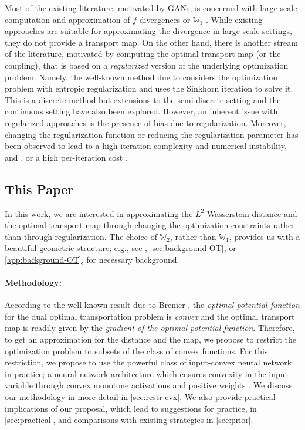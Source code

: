 \documentclass[10pt]{article}
\newcommand{\W}{\mathds{W}}
\numberwithin{equation}{section}
\begin{document}
Most of the existing literature, motivated by GANs, is concerned with large-scale computation and approximation of $f$-divergences \citep{nowozin2016f} or $\W_1$ \citep{arjovsky2017wasserstein}. While existing approaches are suitable for approximating the divergence in large-scale settings, they do not provide a transport map. On the other hand, there is another stream of the literature, motivated by computing the optimal transport map (or the coupling), that is based on a {\em regularized} version of the underlying optimization problem. Namely, the well-known method due to \citet{cuturi2013sinkhorn} considers the optimization problem with entropic regularization and uses the Sinkhorn iteration to solve it. 
This is a discrete method but extensions to the semi-discrete setting \citep{aurenhammer1998minkowski,levy2018notions,peyre2017computational} and the continuous setting \citep{genevay2016stochastic,seguy2017large} have also been explored. However, an inherent issue with regularized approaches is the presence of bias due to regularization. Moreover, 
changing the regularization function or reducing the regularization parameter has been observed to lead to a high iteration complexity and numerical instability, \citep{schmitzer2016stabilized,dvurechensky2018computational} and \citep[Remark 4.6]{peyre2017computational}, or a high per-iteration cost \citep{blondel2017smooth,peyre2017computational}. 

\subsection{This Paper}
In this work, we are interested in approximating the $L^2$-Wasserstein distance and the optimal transport map through changing the optimization constraints rather than through regularization. The choice of $\W_2$, rather than $\W_1$, provides us with a beautiful geometric structure; e.g., see \citet[Chapter 2]{villani2003topics}, \autoref{sec:background-OT}, or \autoref{app:background-OT}, for necessary background.

\paragraph{Methodology:} According to the well-known result due to Brenier \citep[Theorem 2.12]{villani2003topics}, the {\em optimal potential function} for the dual optimal transportation problem is {\em convex} and the optimal transport map is readily given by the {\em gradient of the optimal potential function}. Therefore, to get an approximation for the distance and the map, we propose to restrict the optimization problem to subsets of the class of convex functions. For this restriction, we propose to use the powerful class of input-convex neural network \citep{amos2016input} in practice; a neural network architecture which ensures convexity in the input variable through convex monotone activations and positive weights \citep[Section 3.2]{boyd2004convex}. We discuss our methodology in more detail in \autoref{sec:restr-cvx}. We also provide practical implications of our proposal, which lead to suggestions for practice, in \autoref{sec:practical}, and comparisons with existing strategies in \autoref{sec:prior}. 
\end{document}
